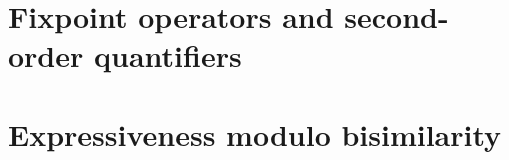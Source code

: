 \documentclass[prodmode,acmtecs]{acmsmall} %
\begin{document}
\section{Fixpoint operators and second-order quantifiers}


\clearpage

\clearpage

\section{Expressiveness modulo bisimilarity}\label{sec:expresso}






\end{document}
